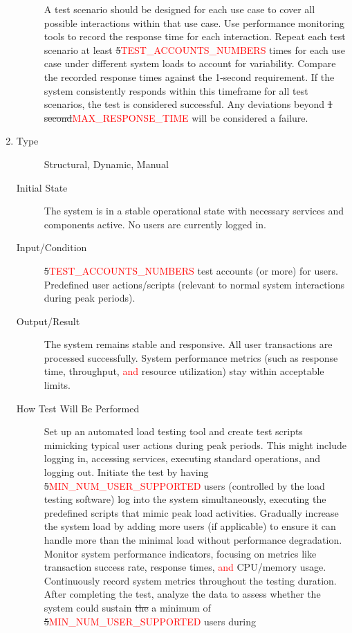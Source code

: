 \documentclass[12pt, titlepage]{article}
\newcommand{\rt}[1]{\textcolor{red}{#1}}
\begin{document}
\begin{enumerate}[NFR-T1]
\begin{description}
    A test scenario should be designed for each use case to cover all possible
    interactions within that use case. Use performance monitoring tools to
    record the response time for each interaction. Repeat each test scenario at
    least \sout{5}\rt{TEST\_ACCOUNTS\_NUMBERS} times for each use case under different system loads to account for
    variability. Compare the recorded response times against the 1-second
    requirement. If the system consistently responds within this timeframe for
    all test scenarios, the test is considered successful. Any deviations beyond
    \sout{1 second}\rt{MAX\_RESPONSE\_TIME} will be considered a failure.
  \end{description}
\item \label{NFRT3}
  \begin{description}
  \item[Type] Structural, Dynamic, Manual
  \item[Initial State] The system is in a stable operational state with necessary
    services and components active. No users are currently logged in.
  \item[Input/Condition] \sout{5}\rt{TEST\_ACCOUNTS\_NUMBERS} test accounts (or more) for users. Predefined user
    actions/scripts (relevant to normal system interactions during peak
    periods).
  \item[Output/Result] The system remains stable and responsive. All user
    transactions are processed successfully. System performance metrics (such as
    response time, throughput, \rt{and} resource utilization) stay within acceptable
    limits.
  \item[How Test Will Be Performed] Set up an automated load testing tool and
    create test scripts mimicking typical user actions during peak periods. This
    might include logging in, accessing services, executing standard operations,
    and logging out. Initiate the test by having \sout{5}\rt{MIN\_NUM\_USER\_SUPPORTED} users (controlled by the load
    testing software) log into the system simultaneously, executing the
    predefined scripts that mimic peak load activities. Gradually increase the
    system load by adding more users (if applicable) to ensure it can handle
    more than the minimal load without performance degradation. Monitor system
    performance indicators, focusing on metrics like transaction success rate,
    response times, \rt{and} CPU/memory usage. Continuously record system metrics
    throughout the testing duration. After completing the test, analyze the data
    to assess whether the system could sustain \sout{the} a minimum of \sout{5}\rt{MIN\_NUM\_USER\_SUPPORTED} users during

\end{description}
\end{enumerate}
\end{document}
